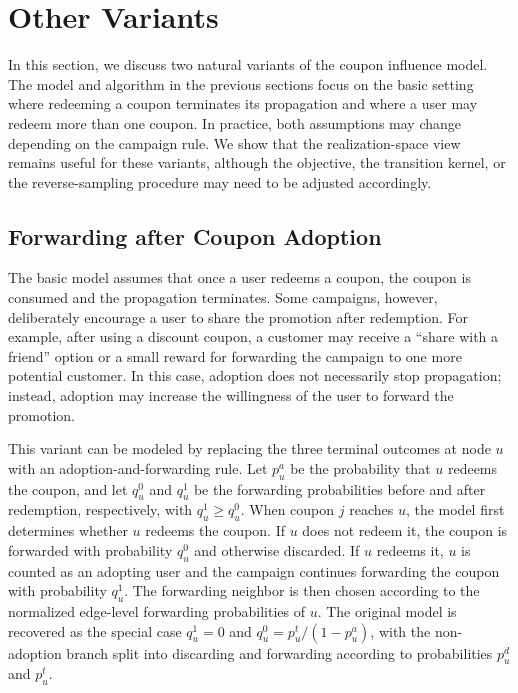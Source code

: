 \documentclass[sigconf]{acmart}
\begin{document}
\section{Other Variants}
\label{sec:variants}

In this section, we discuss two natural variants of the coupon influence
model.
The model and algorithm in the previous sections focus on the basic
setting where redeeming a coupon terminates its propagation and where a
user may redeem more than one coupon.
In practice, both assumptions may change depending on the campaign rule.
We show that the realization-space view remains useful for these variants,
although the objective, the transition kernel, or the reverse-sampling
procedure may need to be adjusted accordingly.

\subsection{Forwarding after Coupon Adoption}
\label{sec:variant-adopt-forward}

The basic model assumes that once a user redeems a coupon, the coupon is
consumed and the propagation terminates.
Some campaigns, however, deliberately encourage a user to share the
promotion after redemption.
For example, after using a discount coupon, a customer may receive a
``share with a friend'' option or a small reward for forwarding the
campaign to one more potential customer.
In this case, adoption does not necessarily stop propagation; instead,
adoption may increase the willingness of the user to forward the
promotion.

This variant can be modeled by replacing the three terminal outcomes at
node $u$ with an adoption-and-forwarding rule.
Let $p_u^a$ be the probability that $u$ redeems the coupon, and let
$q_u^0$ and $q_u^1$ be the forwarding probabilities before and after
redemption, respectively, with $q_u^1\geq q_u^0$.
When coupon $j$ reaches $u$, the model first determines whether $u$
redeems the coupon.
If $u$ does not redeem it, the coupon is forwarded with probability
$q_u^0$ and otherwise discarded.
If $u$ redeems it, $u$ is counted as an adopting user and the campaign
continues forwarding the coupon with probability $q_u^1$.
The forwarding neighbor is then chosen according to the normalized
edge-level forwarding probabilities of $u$.
The original model is recovered as the special case $q_u^1=0$ and
$q_u^0=p_u^t/(1-p_u^a)$, with the non-adoption branch split into
discarding and forwarding according to probabilities $p_u^d$ and
$p_u^t$.
\end{document}
